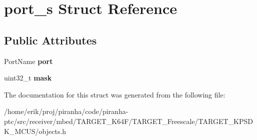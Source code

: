 \hypertarget{structport__s}{}\section{port\+\_\+s Struct Reference}
\label{structport__s}
\subsection*{Public Attributes}
\begin{DoxyCompactItemize}
\item 
Port\+Name {\bfseries port}\hypertarget{structport__s_a8db52e51a52d636c3537c837e37f505d}{}\label{structport__s_a8db52e51a52d636c3537c837e37f505d}

\item 
uint32\+\_\+t {\bfseries mask}\hypertarget{structport__s_a1cfd93e0c8deae9f8cff5c734f02db16}{}\label{structport__s_a1cfd93e0c8deae9f8cff5c734f02db16}

\end{DoxyCompactItemize}


The documentation for this struct was generated from the following file\+:\begin{DoxyCompactItemize}
\item 
/home/erik/proj/piranha/code/piranha-\/ptc/src/receiver/mbed/\+T\+A\+R\+G\+E\+T\+\_\+\+K64\+F/\+T\+A\+R\+G\+E\+T\+\_\+\+Freescale/\+T\+A\+R\+G\+E\+T\+\_\+\+K\+P\+S\+D\+K\+\_\+\+M\+C\+U\+S/objects.\+h\end{DoxyCompactItemize}
